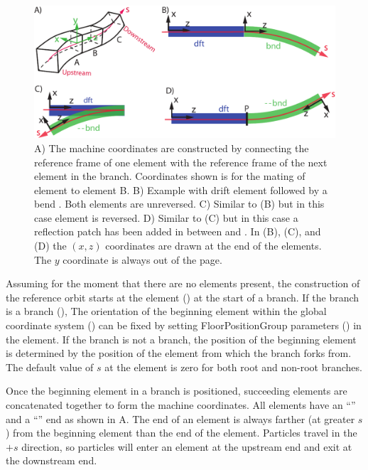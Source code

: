 \begin{figure}[tb]
  \centering
  \includegraphics[width=5in]{patch-between.pdf}
  \caption[Machine coordinates construction.]{A) The machine coordinates are constructed by
connecting the  reference frame of one element with the  reference frame
of the next element in the branch. Coordinates shown is for the mating of element  to element
{B}.  B) Example with drift element  followed by a bend . Both elements are
unreversed. C) Similar to (B) but in this case element  is reversed.  D) Similar to (C) but
in this case a reflection patch has been added in between  and .  In (B), (C), and
(D) the $(x,z)$ coordinates are drawn at the  end of the elements. The $y$ coordinate
is always out of the page.}
  \label{f:patch.between}
\end{figure}

Assuming for the moment that there are no  elements present, the construction of the
reference orbit starts at the  element () at the start of a
branch. If the branch is a  branch (), The orientation of the beginning
element within the global coordinate system () can be fixed by setting 
FloorPositionGroup parameters () in the  element.
If the branch is not a  branch, the position
of the beginning element is determined by the position of the  element
from which the branch forks from. The default value of $s$ at the  element is zero
for both root and non-root branches.

Once the beginning element in a branch is positioned, succeeding elements are concatenated together
to form the machine coordinates. All elements have an ``'' and a ``''
end as shown in A. The  end of an element is always farther (at
greater $s$) from the beginning element than the  end of the element.  Particles travel
in the $+s$ direction, so particles will enter an element at the upstream end and exit at the
downstream end.

